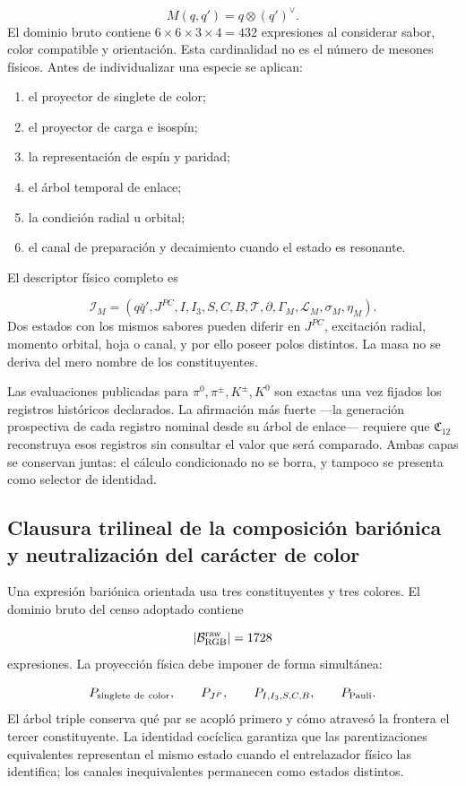 \[
M(q,q')=q\otimes(q')^\vee.
\]
El dominio bruto contiene \(6\times6\times3\times4=432\) expresiones al considerar sabor, color compatible y orientación. Esta cardinalidad no es el número de mesones físicos. Antes de individualizar una especie se aplican:

\begin{enumerate}
\item el proyector de singlete de color;
\item el proyector de carga e isospín;
\item la representación de espín y paridad;
\item el árbol temporal de enlace;
\item la condición radial u orbital;
\item el canal de preparación y decaimiento cuando el estado es resonante.
\end{enumerate}
El descriptor físico completo es

\[
\mathcal I_M=
(q\bar q',J^{PC},I,I_3,S,C,B,\mathcal T,\partial,
\Gamma_M,\mathcal L_M,\sigma_M,\eta_M).
\]
Dos estados con los mismos sabores pueden diferir en \(J^{PC}\), excitación radial, momento orbital, hoja o canal, y por ello poseer polos distintos. La masa no se deriva del mero nombre de los constituyentes.

Las evaluaciones publicadas para \(\pi^0,\pi^\pm,K^\pm,K^0\) son exactas una vez fijados los registros históricos declarados. La afirmación más fuerte ---la generación prospectiva de cada registro nominal desde su árbol de enlace--- requiere que \(\mathfrak C_{12}\) reconstruya esos registros sin consultar el valor que será comparado. Ambas capas se conservan juntas: el cálculo condicionado no se borra, y tampoco se presenta como selector de identidad.

\subsection{Clausura trilineal de la composición bariónica y neutralización del carácter de color}
Una expresión bariónica orientada usa tres constituyentes y tres colores. El dominio bruto del censo adoptado contiene

\[
\lvert\mathcal B_{\rm RGB}^{\rm raw}\rvert=1728
\]
expresiones. La proyección física debe imponer de forma simultánea:

\[
P_{\rm singlete\ de\ color},
\qquad
P_{J^P},
\qquad
P_{I,I_3,S,C,B},
\qquad
P_{\rm Pauli}.
\]
El árbol triple conserva qué par se acopló primero y cómo atravesó la frontera el tercer constituyente. La identidad cocíclica garantiza que las parentizaciones equivalentes representan el mismo estado cuando el entrelazador físico las identifica; los canales inequivalentes permanecen como estados distintos.

